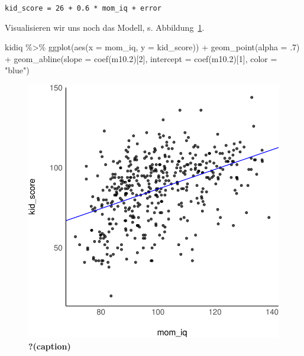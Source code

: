 \documentclass[
  a4paper,
  DIV=11]{scrreprt}
\newenvironment{Shaded}{\begin{snugshade}}{\end{snugshade}}
\newcommand{\AttributeTok}[1]{\textcolor[rgb]{0.40,0.45,0.13}{#1}}
\newcommand{\DecValTok}[1]{\textcolor[rgb]{0.68,0.00,0.00}{#1}}
\newcommand{\FloatTok}[1]{\textcolor[rgb]{0.68,0.00,0.00}{#1}}
\newcommand{\FunctionTok}[1]{\textcolor[rgb]{0.28,0.35,0.67}{#1}}
\newcommand{\NormalTok}[1]{\textcolor[rgb]{0.00,0.23,0.31}{#1}}
\newcommand{\SpecialCharTok}[1]{\textcolor[rgb]{0.37,0.37,0.37}{#1}}
\newcommand{\StringTok}[1]{\textcolor[rgb]{0.13,0.47,0.30}{#1}}
\theoremstyle{definition}
\theoremstyle{remark}
\begin{document}
\texttt{kid\_score\ =\ 26\ +\ 0.6\ *\ mom\_iq\ +\ error}

Visualisieren wir uns noch das Modell, s.
Abbildung~\ref{fig-kidiqmomiq}.

\begin{Shaded}
\begin{Highlighting}[]
\NormalTok{kidiq }\SpecialCharTok{\%\textgreater{}\%} 
  \FunctionTok{ggplot}\NormalTok{(}\FunctionTok{aes}\NormalTok{(}\AttributeTok{x =}\NormalTok{ mom\_iq, }\AttributeTok{y =}\NormalTok{ kid\_score)) }\SpecialCharTok{+}
  \FunctionTok{geom\_point}\NormalTok{(}\AttributeTok{alpha =}\NormalTok{ .}\DecValTok{7}\NormalTok{) }\SpecialCharTok{+}
  \FunctionTok{geom\_abline}\NormalTok{(}\AttributeTok{slope =} \FunctionTok{coef}\NormalTok{(m10}\FloatTok{.2}\NormalTok{)[}\DecValTok{2}\NormalTok{],}
              \AttributeTok{intercept =} \FunctionTok{coef}\NormalTok{(m10}\FloatTok{.2}\NormalTok{)[}\DecValTok{1}\NormalTok{],}
              \AttributeTok{color =} \StringTok{"blue"}\NormalTok{)}
\end{Highlighting}
\end{Shaded}

\begin{figure}[H]

{\centering \includegraphics{./metrische-AV_files/figure-pdf/fig-kidiqmomiq-1.pdf}

}

\caption{\label{fig-kidiqmomiq}\textbf{?(caption)}}

\end{figure}
\end{document}
